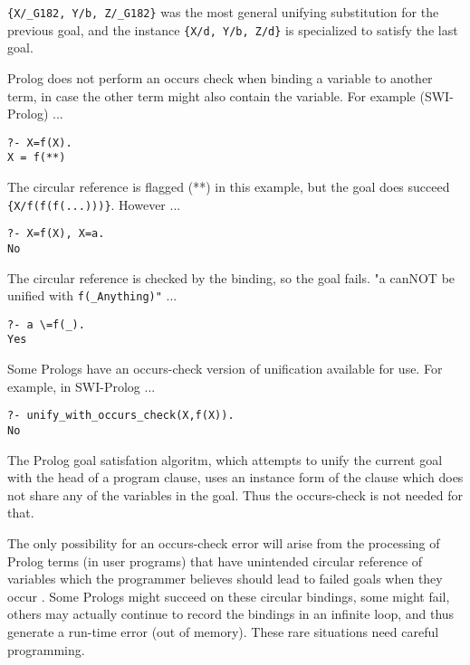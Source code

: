 \verb|{X/_G182, Y/b, Z/_G182}| was the most general unifying substitution for
the previous goal, and the instance \verb|{X/d, Y/b, Z/d}| is specialized to
satisfy the last goal.

Prolog does not perform an occurs check when binding a variable to another term,
in case the other term might also contain the variable. For example (SWI-Prolog)
...

\begin{verbatim}
?- X=f(X).
X = f(**)
\end{verbatim}

The circular reference is flagged (**) in this example, but the goal does
succeed \verb|{X/f(f(f(...)))}|. However ...

\begin{verbatim}
?- X=f(X), X=a.
No
\end{verbatim}

The circular reference is checked by the binding, so the goal fails. "a canNOT
be unified with \verb|f(_Anything)"| ...

\begin{verbatim}
?- a \=f(_).
Yes
\end{verbatim}

Some Prologs have an occurs-check version of unification available for use. For
example, in SWI-Prolog ...

\begin{verbatim}
?- unify_with_occurs_check(X,f(X)).
No
\end{verbatim}

The Prolog goal satisfation algoritm, which attempts to unify the current goal
with the head of a program clause, uses an instance form of the clause which
does not share any of the variables in the goal. Thus the occurs-check is not
needed for that.

The only possibility for an occurs-check error will arise from the processing of
Prolog terms (in user programs) that have unintended circular reference of
variables which the programmer believes should lead to failed goals when they
occur . Some Prologs might succeed on these circular bindings, some might fail,
others may actually continue to record the bindings in an infinite loop, and
thus generate a run-time error (out of memory). These rare situations need
careful programming.

